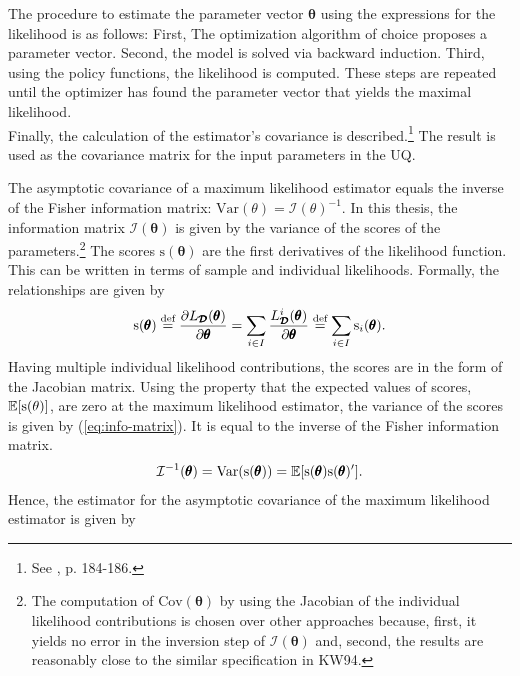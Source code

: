 The procedure to estimate the parameter vector $\pmb{\theta}$ using the expressions for the likelihood is as follows: First, The optimization algorithm of choice proposes a parameter vector. Second, the model is solved via backward induction. Third, using the policy functions, the likelihood is computed. These steps are repeated until the optimizer has found the parameter vector that yields the maximal likelihood.\\
\newline
Finally, the calculation of the estimator's covariance is described.\footnote{See \cite{Verbeek.2012}, p. 184-186.} The result is used as the covariance matrix for the input parameters in the UQ.

The asymptotic covariance of a maximum likelihood estimator equals the inverse of the Fisher information matrix: $\text{Var}(\theta)=\mathcal{I}(\theta)^{-1}$. In this thesis, the information matrix $\mathcal{I}(\pmb{\theta})$ is given by the variance of the scores of the parameters.\footnote{The computation of $\text{Cov}(\pmb{\theta})$ by using the Jacobian of the individual likelihood contributions is chosen over other approaches because, first, it yields no error in the inversion step of $\mathcal{I}(\pmb{\theta})$ and, second, the results are reasonably close to the similar specification in KW94.} The scores $\text{s}(\pmb{\theta})$ are the first derivatives of the likelihood function. This can be written in terms of sample and individual likelihoods. Formally, the relationships are given by
\begin{align} \label{eq:scores}
\text{s}(\pmb{\theta}) \stackrel{\text{def}}{=} \frac{\partial L_{\pmb{\mathcal{D}}}({\pmb{\theta}})} {\partial \pmb{\theta}} = \sum_{i \in I} \frac{L_{\pmb{\mathcal{D}}}^{i}(\pmb{\theta})}{\partial \pmb{\theta}} \stackrel{\text{def}}{=} \sum_{i \in I}\text{s}_i(\pmb{\theta}).
\end{align}
Having multiple individual likelihood contributions, the scores are in the form of the  Jacobian matrix.
Using the property that the expected values of scores, $\operatorname*{\mathbb{E}}[\text{s}(\theta)]$, are zero at the maximum likelihood estimator, the variance of the scores is given by (\ref{eq:info-matrix}). It is equal to the inverse of the Fisher information matrix.
\begin{align} \label{eq:info-matrix}
\mathcal{I}^{-1}(\pmb{\theta}) = \text{Var}(\text{s}(\pmb{\theta})) = \operatorname*{\mathbb{E}}[\text{s}(\pmb{\theta})\text{s}(\pmb{\theta})'].
\end{align}
Hence, the estimator for the asymptotic covariance of the maximum likelihood estimator is given by
